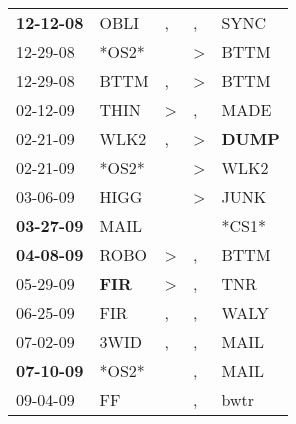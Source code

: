 \begin{supertabular}{p{0.07\textwidth}p{0.06\textwidth}p{0.02\textwidth}p{0.02\textwidth}p{0.06\textwidth}}
 \textbf{12-12-08\textsuperscript{}} &           OBLI\textsuperscript{} &                , &                , &           SYNC\textsuperscript{} \\
          12-29-08\textsuperscript{} &                            *OS2* &                  &     \textgreater &           BTTM\textsuperscript{} \\
          12-29-08\textsuperscript{} &           BTTM\textsuperscript{} &                , &     \textgreater &           BTTM\textsuperscript{} \\
          02-12-09\textsuperscript{} &           THIN\textsuperscript{} &     \textgreater &                , &           MADE\textsuperscript{} \\
          02-21-09\textsuperscript{} &           WLK2\textsuperscript{} &                , &     \textgreater &  \textbf{DUMP\textsuperscript{}} \\
          02-21-09\textsuperscript{} &                            *OS2* &                  &     \textgreater &           WLK2\textsuperscript{} \\
          03-06-09\textsuperscript{} &           HIGG\textsuperscript{} &                  &     \textgreater &           JUNK\textsuperscript{} \\
 \textbf{03-27-09\textsuperscript{}} &           MAIL\textsuperscript{} &                  &                  &                            *CS1* \\
 \textbf{04-08-09\textsuperscript{}} &           ROBO\textsuperscript{} &     \textgreater &                , &           BTTM\textsuperscript{} \\
          05-29-09\textsuperscript{} &   \textbf{FIR\textsuperscript{}} &     \textgreater &                , &            TNR\textsuperscript{} \\
          06-25-09\textsuperscript{} &            FIR\textsuperscript{} &                , &                , &           WALY\textsuperscript{} \\
          07-02-09\textsuperscript{} &           3WID\textsuperscript{} &                , &                , &           MAIL\textsuperscript{} \\
 \textbf{07-10-09\textsuperscript{}} &                            *OS2* &                  &                , &           MAIL\textsuperscript{} \\
          09-04-09\textsuperscript{} &             FF\textsuperscript{} &                  &                , &           bwtr\textsuperscript{} \\

\end{supertabular}
